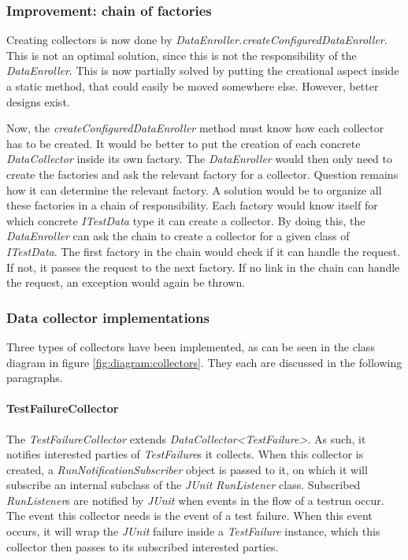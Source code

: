 \documentclass[i2]{oss}
\newcommand{\class}[1]{\emph{#1}}
\newcommand{\method}[1]{\emph{#1}}
\newcommand{\junit}{\emph{JUnit }}
\begin{document}
\subsubsection{Improvement: chain of factories}

Creating collectors is now done by \class{DataEnroller.createConfiguredDataEnroller}.
This is not an optimal solution, since this is not the responsibility of the \class{DataEnroller}.
This is now partially solved by putting the creational aspect inside a static method, that could easily be moved somewhere else.
However, better designs exist.

Now, the \method{createConfiguredDataEnroller} method must know how each collector has to be created.
It would be better to put the creation of each concrete \class{DataCollector} inside its own factory.
The \class{DataEnroller} would then only need to create the factories and ask the relevant factory for a collector.
Question remains how it can determine the relevant factory.
A solution would be to organize all these factories in a chain of responsibility.
Each factory would know itself for which concrete \class{ITestData} type it can create a collector.
By doing this, the \class{DataEnroller} can ask the chain to create a collector for a given class of \class{ITestData}.
The first factory in the chain would check if it can handle the request.
If not, it passes the request to the next factory.
If no link in the chain can handle the request, an exception would again be thrown.

\subsubsection{Data collector implementations}

Three types of collectors have been implemented, as can be seen in the class diagram in figure \ref{fig:diagram:collectors}.
They each are discussed in the following paragraphs.

\paragraph{TestFailureCollector} 
\hfill

The \class{TestFailureCollector} extends \class{DataCollector<TestFailure>}.
As such, it notifies interested parties of \class{TestFailure}s it collects.
When this collector is created, a \class{RunNotificationSubscriber} object is passed to it, on which it will subscribe an internal subclass of the \junit \class{RunListener} class.
Subscribed \class{RunListener}s are notified by \junit when events in the flow of a testrun occur.
The event this collector needs is the event of a test failure.
When this event occurs, it will wrap the \junit failure inside a \class{TestFailure} instance, which this collector then passes to its subscribed interested parties.
\end{document}
